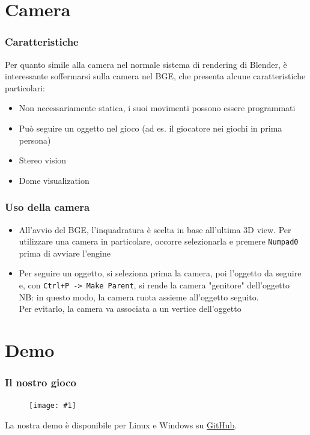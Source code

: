 \documentclass{beamer}
\def\code#1{\texttt{#1}}
\def\image[#1][#2]{
	\begin{figure}[H]
		\centering
		\texttt{[image: \#1]}
\end{figure}}
\begin{document}
	\section{Camera}
	\begin{frame}
	\frametitle{Caratteristiche}
		Per quanto simile alla camera nel normale sistema di rendering di Blender, è interessante soffermarsi sulla camera nel BGE, che presenta alcune caratteristiche particolari:
		\begin{itemize}
			\item Non necessariamente statica, i suoi movimenti possono essere programmati
			\item Può seguire un oggetto nel gioco (ad es. il giocatore nei giochi in prima persona)
			\item Stereo vision
			\item Dome visualization
		\end{itemize}
	\end{frame}	
	\begin{frame}
	\frametitle{Uso della camera}
	\begin{itemize}
		\item All'avvio del BGE, l'inquadratura è scelta in base all'ultima 3D view. Per utilizzare una camera in particolare, occorre selezionarla e premere \code{Numpad0} prima di avviare l'engine
		\item Per seguire un oggetto, si seleziona prima la camera, poi l'oggetto da seguire e, con \code{Ctrl+P -> Make Parent}, si rende la camera "genitore" dell'oggetto \\ {\footnotesize \hspace{1em} NB: in questo modo, la camera ruota assieme all'oggetto seguito. \\ \hspace{1em} Per evitarlo, la camera va associata a un vertice dell'oggetto}
	\end{itemize}
	\end{frame}
\section{Demo}
\begin{frame}
	\frametitle{Il nostro gioco}
	\image[images/game.jpg][scale=0.3]
	La nostra demo è disponibile per Linux e Windows su \href{https://github.com/Disorganizzazione/blender-presentations}{\textcolor{BlenderOrange}{GitHub}}.
\end{frame}
\end{document}
